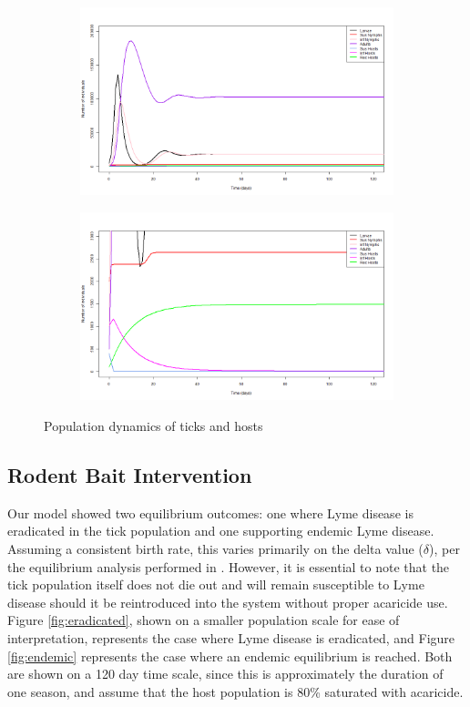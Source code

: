 \documentclass[12pt, centerh1]{article}
\begin{document}
\begin{figure}[h!]
\begin{subfigure}{\textwidth}
    \centering
    \includegraphics[scale = 0.4]{figures/base_large.png}
\end{subfigure}
\begin{subfigure}{\textwidth}
    \centering
    \includegraphics[scale = 0.4]{figures/base_small.png}
\end{subfigure}
\caption{Population dynamics of ticks and hosts}
\label{fig:base_model}
\end{figure}

\subsection{Rodent Bait Intervention}
Our model showed two equilibrium outcomes: one where Lyme disease is eradicated in the tick population and one supporting endemic Lyme disease. Assuming a consistent birth rate, this varies primarily on the delta value ($\delta$), per the equilibrium analysis performed in \cite{tosato2021host}. However, it is essential to note that the tick population itself does not die out and will remain susceptible to Lyme disease should it be reintroduced into the system without proper acaricide use. Figure \ref{fig:eradicated}, shown on a smaller population scale for ease of interpretation, represents the case where Lyme disease is eradicated, and Figure \ref{fig:endemic} represents the case where an endemic equilibrium is reached. Both are shown on a 120 day time scale, since this is approximately the duration of one season, and assume that the host population is 80\% saturated with acaricide.
\end{document}
